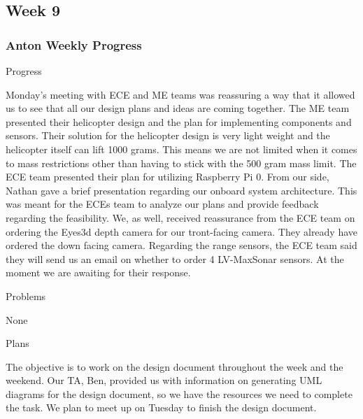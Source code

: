 \documentclass[onecolumn, oneside, letterpaper, draftclsnofoot, 10pt, compsoc]{IEEEtran}
\begin{document}
\subsection{Week 9}

\subsubsection{Anton Weekly Progress}
Progress

Monday's meeting with ECE and ME teams was reassuring a way that it allowed us to see that all our design plans and ideas are coming together. The ME team presented their helicopter design and the plan for implementing components and sensors. Their solution for the helicopter design is very light weight and the helicopter itself can lift 1000 grams. This means we are not limited when it comes to mass restrictions other than having to stick with the 500 gram mass limit. The ECE team presented their plan for utilizing Raspberry Pi 0. From our side, Nathan gave a brief presentation regarding our onboard system architecture. This was meant for the ECEs team to analyze our plans and provide feedback regarding the feasibility. We, as well, received reassurance from the ECE team on ordering the Eyes3d depth camera for our tront-facing camera. They already have ordered the down facing camera. Regarding the range sensors, the ECE team said they will send us an email on whether to order 4 LV-MaxSonar sensors. At the moment we are awaiting for their response.

Problems

None

Plans

The objective is to work on the design document throughout the week and the weekend. Our TA, Ben, provided us with information on generating UML diagrams for the design document, so we have the resources we need to complete the task. We plan to meet up on Tuesday to finish the design document.
\end{document}
